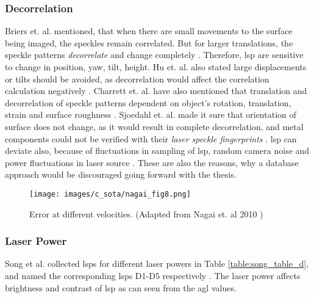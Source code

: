     \subsubsection{Decorrelation}\label{subsubsection:decorrelation}
    Briers et. al. mentioned, that when there are small movements to the surface being imaged, the speckles remain correlated. But for larger translations, the speckle patterns \emph{decorrelate} and change completely \cite{briers}. Therefore, \gls{lsp} are sensitive to change in position, yaw, tilt, height. Hu et. al. also stated large displacements or tilts should be avoided, as decorrelation would affect the correlation calculation negatively \cite{hu}. Charrett et. al. have also mentioned that translation and decorrelation of speckle patterns dependent on object's rotation, translation, strain and surface roughness \cite{charrett_2018}. Sjoedahl et. al. made it sure that orientation of surface does not change, as it would result in complete decorrelation, and metal components could not be verified with their \emph{laser speckle fingerprints} \cite{sjoedahl}. \Gls{lsp} can deviate also, because of fluctuations in sampling of \Gls{lsp}, random camera noise and power fluctuations in laser source \cite{charrett_2019}. These are also the reasons, why a database approach would be discouraged going forward with the thesis.


    \begin{figure}[h]
        \centering
        \texttt{[image: images/c\_sota/nagai\_fig8.png]}
        \caption{Error at different velocities. (Adapted from Nagai et. al 2010 \cite{nagai})}
        \label{fig:nagai_fig8}
    \end{figure}
    

    \subsubsection{Laser Power}
    Song et al. collected \glspl{lsp} for different laser powers in Table \ref{table:song_table_d}, and named the corresponding \glspl{lsp} D1-D5 respectively \cite{song}. The laser power affects brightness and contrast of \gls{lsp} as can seen from the \gls{agl} values.

